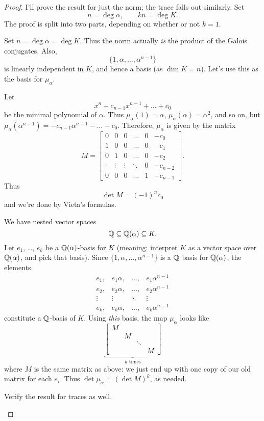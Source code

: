 \begin{proof}
I'll prove the result for just the norm; the trace falls out similarly.
Set
\[ n = \deg \alpha, \qquad kn = \deg K. \]
The proof is split into two parts, depending on whether or not $k=1$.
\begin{subproof}[Proof if $k=1$]
	Set $n = \deg \alpha = \deg K$.
	Thus the norm actually \emph{is} the product of the Galois conjugates.
	Also, \[ \{1, \alpha, \dots, \alpha^{n-1}\} \]
	is linearly independent in $K$, and hence a basis (as $\dim K = n$).
	Let's use this as the basis for $\mu_\alpha$.

	Let \[ x^n+c_{n-1}x^{n-1} + \dots + c_0  \]be the minimal polynomial of $\alpha$.
	Thus $\mu_\alpha(1) = \alpha$, $\mu_\alpha(\alpha) = \alpha^2$, and so on,
	but $\mu_\alpha(\alpha^{n-1}) = -c_{n-1}\alpha^{n-1} - \dots - c_0$.
	Therefore, $\mu_\alpha$ is given by the matrix
	\[
		M =
		\begin{bmatrix}
			0 & 0 & 0 & \dots & 0 & -c_0 \\
			1 & 0 & 0 & \dots & 0 & -c_1 \\
			0 & 1 & 0 & \dots & 0 & -c_2 \\
			\vdots & \vdots & \vdots & \ddots & 0 & -c_{n-2} \\
			0 & 0 & 0 & \dots & 1 & -c_{n-1}
		\end{bmatrix}.
	\]
	Thus \[ \det M = (-1)^n c_0 \] and we're done by Vieta's formulas.
\end{subproof}
\begin{subproof}[Proof if $k > 1$]
	We have nested vector spaces
	\[ \mathbb Q \subseteq \mathbb Q(\alpha) \subseteq K. \]
	Let $e_1$, \dots, $e_k$ be a $\mathbb Q(\alpha)$-basis for $K$
	(meaning: interpret $K$ as a vector space over $\mathbb Q(\alpha)$, and pick that basis).
	Since $\{1, \alpha, \dots, \alpha^{n-1}\}$ is a $\mathbb Q$ basis for $\mathbb Q(\alpha)$,
	the elements
	\[
			\begin{array}{cccc}
			e_1, & e_1\alpha, & \dots, & e_1\alpha^{n-1} \\
			e_2, & e_2\alpha, & \dots, & e_2\alpha^{n-1} \\
			\vdots & \vdots & \ddots & \vdots \\
			e_k, & e_k\alpha, & \dots, & e_k\alpha^{n-1}
			\end{array}
	\]
	constitute a $\mathbb Q$-basis of $K$.
	Using \emph{this} basis, the map $\mu_\alpha$ looks like
	\[
			\underbrace{
			\begin{bmatrix}
					M & & & \\
					& M & & \\
					& & \ddots & \\
					& & & M
			\end{bmatrix}
			}_{\text{$k$ times}}
	\]
	where $M$ is the same matrix as above:
	we just end up with one copy of our old matrix for each $e_i$.
	Thus $\det \mu_\alpha = (\det M)^k$, as needed. \qedhere
\end{subproof}
\begin{ques}
	Verify the result for traces as well. \qedhere
\end{ques}
\end{proof}

